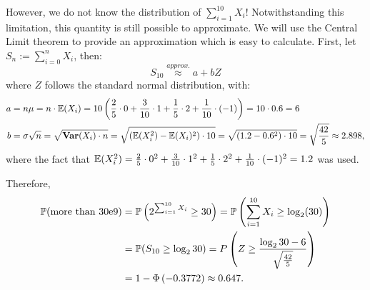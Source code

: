 \documentclass{article}
\begin{document}
However, we do not know the distribution of $\sum_{i=1}^{10}X_i$! Notwithstanding this limitation, this quantity is still possible to approximate. We will use the Central Limit theorem to provide an approximation which is easy to calculate. First, let $S_n := \sum^{n}_{i=0} X_i$, then:
$$S_{10} \overset{approx.}{\approx} a + bZ$$
where $Z$ follows the standard normal distribution, with:
\begin{align*}
a & = n\mu = n \cdot \E(X_i) = 10 \left( \frac{2}{5} \cdot 0 + \frac{3}{10} \cdot 1 + \frac{1}{5} \cdot 2 + \frac{1}{10} \cdot (-1) \right) = 10 \cdot 0.6 = 6 \\
b & = \sigma \sqrt{n} = \sqrt{\var(X_i) \cdot n} = \sqrt{\left( \E(X_i^2) - \E(X_i)^2 \right) \cdot 10} = \sqrt{\left( 1.2 - 0.6^2 \right) \cdot 10} = \sqrt{\frac{42}{5}}\approx 2.898,
\end{align*}
where the fact that $\E(X_i^2) = \frac{2}{5} \cdot 0^2 + \frac{3}{10} \cdot 1^2 + \frac{1}{5} \cdot 2^2 + \frac{1}{10} \cdot (-1)^2 = 1.2$ was used.

Therefore, 
\begin{align*}
\P(\mbox{more than 30e9}) &= \P\left(2^{\sum_{i=1}^{10}X_i} \geq 30\right) = \P\left(\sum_{i=1}^{10}X_i \geq \log_2(30)\right) \\ 
&= \P(S_{10} \geq \log_2{30}) = P\left(Z \geq \frac{\log_2{30} - 6}{\sqrt{\frac{42}{5}}}\right)\\&= 1 - \Phi\left(-0.3772\right) \approx 0.647.
\end{align*}
\end{document}
